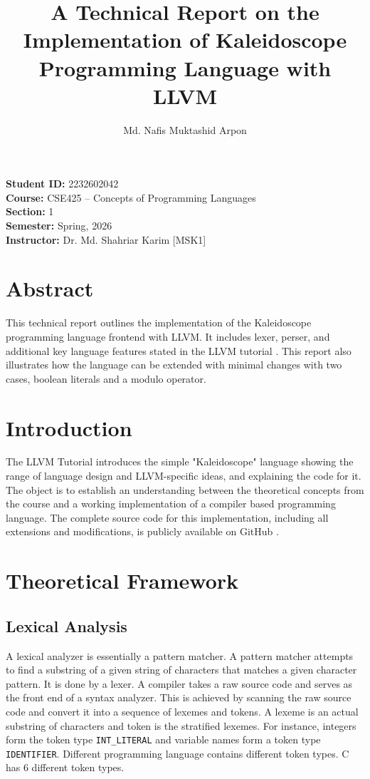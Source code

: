 \documentclass[acmlarge, nonacm]{acmart}
\newcommand{\studentinfo}{%
  \par\vspace{0.5em}
  \noindent\textbf{Student ID:} 2232602042 \\
  \textbf{Course:} CSE425 -- Concepts of Programming Languages \\
  \textbf{Section:} 1 \\
  \textbf{Semester:} Spring, 2026 \\
  \textbf{Instructor:} Dr. Md. Shahriar Karim [MSK1]
}
\begin{document}
\title{A Technical Report on the Implementation of Kaleidoscope Programming Language with LLVM}

\author{Md. Nafis Muktashid Arpon}


\maketitle
\studentinfo\\

\section*{Abstract}
	This technical report outlines the implementation of the Kaleidoscope programming language frontend with LLVM. It includes lexer, perser, and additional key language features stated in the LLVM tutorial \citep{llvm}. This report also illustrates how the language can be extended with minimal changes with two cases, boolean literals and a modulo operator.

\section{Introduction}
The LLVM Tutorial \cite{llvm} introduces the simple "Kaleidoscope" language showing the range of language design and LLVM-specific ideas, and explaining the code for it. The object is to establish an understanding between the theoretical concepts from the course and a working implementation of a compiler based programming language. The complete source code for this implementation, including all extensions and modifications, is publicly available on GitHub \cite{github}.

\section{Theoretical Framework}
\subsection{Lexical Analysis}
A lexical analyzer is essentially a pattern matcher. A pattern matcher attempts to find a substring of a given string of characters that matches a given character pattern. It is done by a lexer. A compiler takes a raw source code and serves as the front end of a syntax analyzer. This is achieved by scanning the raw source code and convert it into a sequence of lexemes and tokens. A lexeme is an actual substring of characters and token is the stratified lexemes. For instance, integers form the token type \verb|INT_LITERAL| and variable names form a token type \verb|IDENTIFIER|. Different programming language contains different token types. C has 6 different token types.
\end{document}
